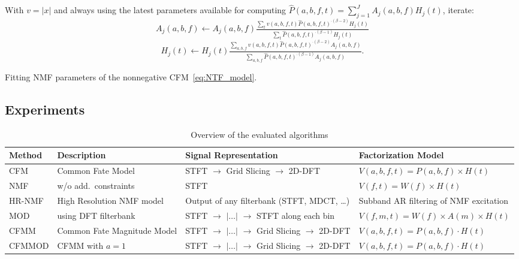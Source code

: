 {{\begin{algorithm}
With $v=\left|x\right|$ and always using the latest
parameters available for computing
 $\hat{P}\left(a,b,f,t\right)=\sum\limits_{j=1}^{J}A_{j}\left(a,b,f\right)H_{j}\left(t\right)$,
iterate:
\[
A_{j}\left(a,b,f\right)\leftarrow A_{j}\left(a,b,f\right)\tfrac{\sum_{t}v\left(a,b,f,t\right)\hat{P}\left(a,b,f,t\right)^{\cdot\left(\beta-2\right)}H_{j}\left(t\right)}{\sum_{t}\hat{P}\left(a,b,f,t\right)^{\cdot\left(\beta-1\right)}H_{j}\left(t\right)}
\]
\[
H_{j}\left(t\right)\leftarrow H_{j}\left(t\right)\tfrac{\sum_{a,b,f}v\left(a,b,f,t\right)\hat{P}\left(a,b,f,t\right)^{\cdot\left(\beta-2\right)}A_{j}\left(a,b,f\right)}{\sum_{a,b,f}\hat{P}\left(a,b,f,t\right)^{\cdot\left(\beta-1\right)}A_{j}\left(a,b,f\right)}.
\]


\caption{Fitting NMF parameters of the nonnegative CFM~\eqref{eq:NTF_model}.\label{alg:Fitting-NTF}}
\end{algorithm}

\subsection{Experiments}
\label{sec:experiment}

\begin{table}[ht!]
  \centering
  \tiny
\begin{tabular}{ llll }
    \toprule
    Method & Description & Signal Representation & Factorization Model \\
    \midrule
    CFM & Common Fate Model & STFT $\rightarrow$ Grid Slicing $\rightarrow$ 2D-DFT & $V(a,b,f,t) = P(a,b,f)\times H(t)$ \\
    NMF &\cite{virtanen07} w/o add.\ constraints & STFT & $V(f,t) = W(f)\times H(t)$ \\
    HR-NMF & High Resolution NMF model~\cite{magron15a} & Output of any filterbank (STFT, MDCT, \ldots)  & Subband AR filtering of NMF excitation \\
    MOD &\cite{barker13} using DFT filterbank& STFT $\rightarrow$ $|\ldots|$ $\rightarrow$ STFT along each bin & $V(f,m,t) = W(f)\times A(m)\times H(t)$ \\
    CFMM & Common Fate Magnitude Model & STFT $\rightarrow$ $|\ldots|$ $\rightarrow$ Grid Slicing $\rightarrow$ 2D-DFT & $V(a,b,f,t) = P(a,b,f)\cdot H(t)$ \\
    CFMMOD & CFMM with $a=1$ & STFT $\rightarrow$ $|\ldots|$ $\rightarrow$ Grid Slicing $\rightarrow$ 2D-DFT & $V(a,b,f,t) = P(a,b,f)\cdot H(t)$ \\
    \bottomrule
\end{tabular}
\caption{Overview of the evaluated algorithms}
\label{tab:methods}
\end{table}

}}
